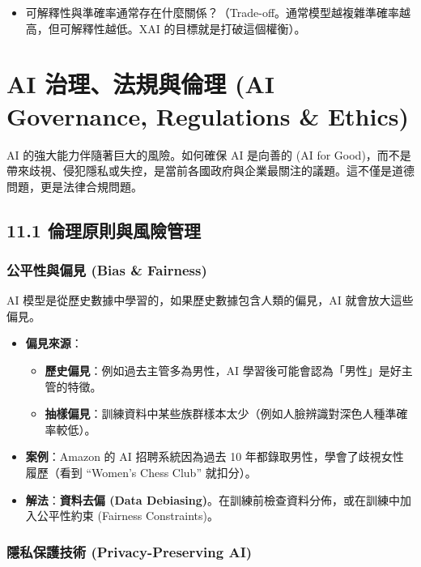 \documentclass[
  letterpaper,
  DIV=11,
  numbers=noendperiod]{scrreprt}
\providecommand{\tightlist}{%
  \setlength{\itemsep}{0pt}\setlength{\parskip}{0pt}}
\begin{document}
\begin{itemize}
\tightlist
\item
  可解釋性與準確率通常存在什麼關係？（Trade-off。通常模型越複雜準確率越高，但可解釋性越低。XAI
  的目標就是打破這個權衡）。
\end{itemize}

\part{AI 治理、法規與倫理 (AI Governance, Regulations \&
Ethics)}\label{ai-ux6cbbux7406ux6cd5ux898fux8207ux502bux7406-ai-governance-regulations-ethics}

AI 的強大能力伴隨著巨大的風險。如何確保 AI 是向善的 (AI for
Good)，而不是帶來歧視、侵犯隱私或失控，是當前各國政府與企業最關注的議題。這不僅是道德問題，更是法律合規問題。

\chapter{11.1 倫理原則與風險管理}\label{sec-ethics-risk}

\section{公平性與偏見 (Bias \& Fairness)}\label{sec-bias-fairness}

AI 模型是從歷史數據中學習的，如果歷史數據包含人類的偏見，AI
就會放大這些偏見。

\begin{itemize}
\tightlist
\item
  \textbf{偏見來源}：

  \begin{itemize}
  \tightlist
  \item
    \textbf{歷史偏見}：例如過去主管多為男性，AI
    學習後可能會認為「男性」是好主管的特徵。
  \item
    \textbf{抽樣偏見}：訓練資料中某些族群樣本太少（例如人臉辨識對深色人種準確率較低）。
  \end{itemize}
\item
  \textbf{案例}：Amazon 的 AI 招聘系統因為過去 10
  年都錄取男性，學會了歧視女性履歷（看到 ``Women's Chess Club''
  就扣分）。
\item
  \textbf{解法}：\textbf{資料去偏 (Data
  Debiasing)}。在訓練前檢查資料分佈，或在訓練中加入公平性約束 (Fairness
  Constraints)。
\end{itemize}

\section{隱私保護技術 (Privacy-Preserving AI)}\label{sec-privacy}
\end{document}
